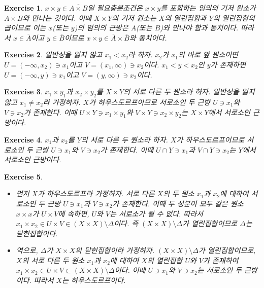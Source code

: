 \documentclass{article}
\newtheorem{exercise}{Exercise}[section]
\begin{document}
\begin{exercise}
    $x\times y\in\overline{A\times B}$일 필요충분조건은 $x\times y$를 포함하는 임의의 기저 원소가 $A\times B$와 만나는 것이다. 이때 $X\times Y$의 기저 원소는 $X$의 열린집합과 $Y$의 열린집합의 곱이므로 이는 $x$(또는 $y$)의 임의의 근방은 $A$(또는 $B$)와 만나야 함과 동치이다. 따라서 $x\in\overline{A}$이고 $y\in\overline{B}$이므로 $x\times y\in\overline{A}\times\overline{B}$와 동치이다.
\end{exercise}

\begin{exercise}
    일반성을 잃지 않고 $x_1<x_2$라 하자. $x_2$가 $x_1$의 바로 앞 원소이면 $U=(-\infty,x_2)\ni x_1$이고 $V=(x_1,\infty)\ni x_2$이다. $x_1<y<x_2$인 $y$가 존재하면 $U=(-\infty,y)\ni x_1$이고 $V=(y,\infty)\ni x_2$이다.
\end{exercise}

\begin{exercise}
    $x_1\times y_1$과 $x_2\times y_2$를 $X\times Y$의 서로 다른 두 원소라 하자. 일반성을 잃지 않고 $x_1\ne x_2$라 가정하자. $X$가 하우스도르프이므로 서로소인 두 근방 $U\ni x_1$와 $V\ni x_2$가 존재한다. 이때 $U\times Y\ni x_1\times y_1$와 $V\times Y\ni x_2\times y_2$는 $X\times Y$에서 서로소인 근방이다. 
\end{exercise}

\begin{exercise}
    $x_1$과 $x_2$를 $Y$의 서로 다른 두 원소라 하자. $X$가 하우스도르프이므로 서로소인 두 근방 $U\ni x_1$와 $V\ni x_2$가 존재한다. 이때 $U\cap Y\ni x_1$과 $V\cap Y\ni x_2$는 $Y$에서 서로소인 근방이다.
\end{exercise}

\begin{exercise}
	\label{exc:17.13}
    \phantom{}
    \begin{itemize}
        \item[($\Longrightarrow$)] 먼저 $X$가 하우스도르프라 가정하자. 서로 다른 $X$의 두 원소 $x_1$과 $x_2$에 대하여 서로소인 두 근방 $U\ni x_1$과 $V\ni x_2$가 존재한다. 이때 두 성분이 모두 같은 원소 $x\times x$가 $U\times V$에 속하면, $U$와 $V$는 서로소가 될 수 없다. 따라서 $x_1\times x_2\in U\times V\in (X\times X)\setminus\Delta$이다. 즉 $(X\times X)\setminus\Delta$가 열린집합이므로 $\Delta$는 닫힌집합이다.
        \item[($\Longleftarrow$)] 역으로, $\Delta$가 $X\times X$의 닫힌집합이라 가정하자. $(X\times X)\setminus\Delta$가 열린집합이므로, $X$의 서로 다른 두 원소 $x_1$과 $x_2$에 대하여 $X$의 열린집합 $U$와 $V$가 존재하여 $x_1\times x_2\in U\times V\subset(X\times X)\setminus\Delta$이다. 이때 $U\ni x_1$와 $V\ni x_2$는 서로소인 두 근방이다. 따라서 $X$는 하우스도르프이다.
    \end{itemize}
\end{exercise}
\end{document}
